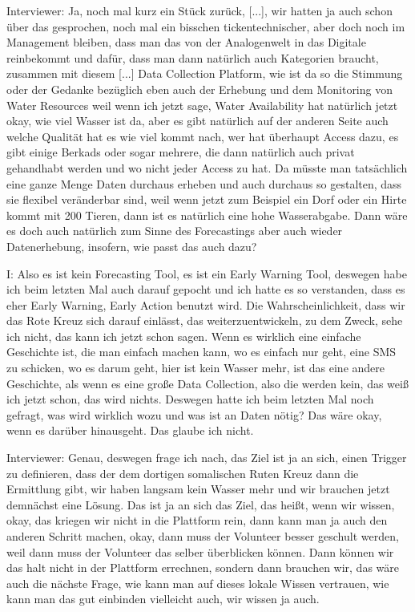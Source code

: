 Interviewer: Ja, noch mal kurz ein Stück zurück, [...], wir hatten ja auch schon über das gesprochen, noch mal ein bisschen tickentechnischer, aber doch noch im Management bleiben, dass man das von der Analogenwelt in das Digitale reinbekommt und dafür, dass man dann natürlich auch Kategorien braucht, zusammen mit diesem [...]  Data Collection Platform, wie ist da so die Stimmung oder der Gedanke bezüglich eben auch der Erhebung und dem Monitoring von Water Resources weil wenn ich jetzt sage, Water Availability hat natürlich jetzt okay, wie viel Wasser ist da, aber es gibt natürlich auf der anderen Seite auch welche Qualität hat es wie viel kommt nach, wer hat überhaupt Access dazu, es gibt einige Berkads oder sogar mehrere, die dann natürlich auch privat gehandhabt werden und wo nicht jeder Access zu hat. Da müsste man tatsächlich eine ganze Menge Daten durchaus erheben und auch durchaus so gestalten, dass sie flexibel veränderbar sind, weil wenn jetzt zum Beispiel ein Dorf oder ein Hirte kommt mit 200 Tieren, dann ist es natürlich eine hohe Wasserabgabe. Dann wäre es doch auch natürlich zum Sinne des Forecastings aber auch wieder Datenerhebung, insofern, wie passt das auch dazu? 

I: Also es ist kein Forecasting Tool, es ist ein Early Warning Tool, deswegen habe ich beim letzten Mal auch darauf gepocht und ich hatte es so verstanden, dass es eher Early Warning, Early Action benutzt wird. Die Wahrscheinlichkeit, dass wir das Rote Kreuz sich darauf einlässt, das weiterzuentwickeln, zu dem Zweck, sehe ich nicht, das kann ich jetzt schon sagen. Wenn es wirklich eine einfache Geschichte ist, die man einfach machen kann, wo es einfach nur geht, eine SMS zu schicken, wo es darum geht, hier ist kein Wasser mehr, ist das eine andere Geschichte, als wenn es eine große Data Collection, also die werden kein, das weiß ich jetzt schon, das wird nichts. Deswegen hatte ich beim letzten Mal noch gefragt, was wird wirklich wozu und was ist an Daten nötig? Das wäre okay, wenn es darüber hinausgeht. Das glaube ich nicht. 

Interviewer: Genau, deswegen frage ich nach, das Ziel ist ja an sich, einen Trigger zu definieren, dass der dem dortigen somalischen Ruten Kreuz dann die Ermittlung gibt, wir haben langsam kein Wasser mehr und wir brauchen jetzt demnächst eine Lösung. Das ist ja an sich das Ziel, das heißt, wenn wir wissen, okay, das kriegen wir nicht in die Plattform rein, dann kann man ja auch den anderen Schritt machen, okay, dann muss der Volunteer besser geschult werden, weil dann muss der Volunteer das selber überblicken können. Dann können wir das halt nicht in der Plattform errechnen, sondern dann brauchen wir, das wäre auch die nächste Frage, wie kann man auf dieses lokale Wissen vertrauen, wie kann man das gut einbinden vielleicht auch, wir wissen ja auch. 

